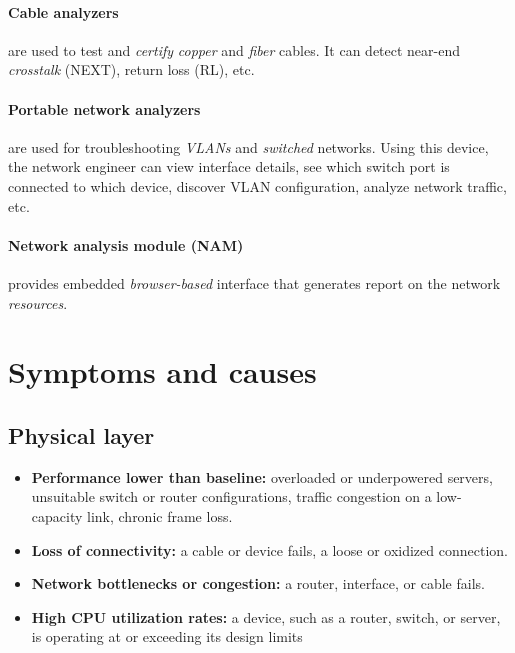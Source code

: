 \paragraph{Cable analyzers} are used to test and \emph{certify} \emph{copper} and \emph{fiber} cables. It can detect near-end \emph{crosstalk} (NEXT), return loss (RL), etc.

\paragraph{Portable network analyzers} are used for troubleshooting \emph{VLANs} and \emph{switched} networks. Using this device, the network engineer can view interface details, see which switch port is connected to which device, discover VLAN configuration, analyze network traffic, etc.

\paragraph{Network analysis module (NAM)} provides embedded \emph{browser-based} interface that generates report on the network \emph{resources}.

\section{Symptoms and causes}

\subsection{Physical layer}

\begin{itemize}
\item \textbf{Performance lower than baseline:} overloaded or underpowered servers, unsuitable switch or router configurations, traffic congestion on a low-capacity link, chronic frame loss.

\item \textbf{Loss of connectivity:} a cable or device fails, a loose or oxidized connection.

\item \textbf{Network bottlenecks or congestion:} a router, interface, or cable fails.

\item \textbf{High CPU utilization rates:} a device, such as a router, switch, or server, is operating at or exceeding its design limits
\end{itemize}

